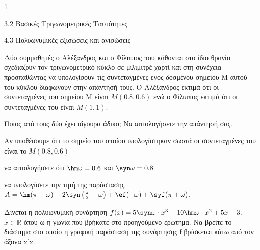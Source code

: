 \begin{ylh}{1}
\item 3.2 Βασικές Τριγωνομετρικές Ταυτότητες
\item 4.3 Πολυωνυμικές εξισώσεις και ανισώσεις
\end{ylh}
Δύο συμμαθητές ο Αλέξανδρος και ο Φίλιππος που κάθονται στο ίδιο θρανίο σχεδιάζουν τον τριγωνομετρικό κύκλο σε μιλιμιτρέ χαρτί και στη συνέχεια προσπαθώντας να υπολογίσουν τις συντεταγμένες ενός δοσμένου σημείου Μ αυτού του κύκλου διαφωνούν στην απάντησή τους. Ο Αλέξανδρος εκτιμά ότι οι συντεταγμένες του σημείου Μ είναι $M(0.8, 0.6)$ ενώ ο Φίλιππος εκτιμά ότι οι συντεταγμένες του είναι $M(1, 1)$.
\begin{alist}
\item Ποιος από τους δύο έχει σίγουρα άδικο; Να αιτιολογήσετε την απάντησή σας.
\item Αν υποθέσουμε ότι το σημείο του οποίου υπολογίστηκαν σωστά οι συντεταγμένες του είναι το $M(0.8, 0.6)$
\begin{rlist}
\item να αιτιολογήσετε ότι $\hm \omega = 0.6$ και $\syn \omega = 0.8$
\item να υπολογίσετε την τιμή της παράστασης
$A = \hm (\pi - \omega) - 2\syn \left(\frac{\pi}{2} - \omega\right) + \ef (-\omega) + \syf (\pi + \omega)$.
\end{rlist}
\item Δίνεται η πολυωνυμική συνάρτηση $f(x) = 5\syn \omega \cdot x^3 - 10\hm \omega \cdot x^2 + 5x - 3$, $x \in \mathbb{R}$ όπου ω η γωνία που βρήκατε στο προηγούμενο ερώτημα. Να βρείτε το διάστημα στο οποίο η γραφική παράσταση της συνάρτησης f βρίσκεται κάτω από τον άξονα x΄x.
\end{alist}

